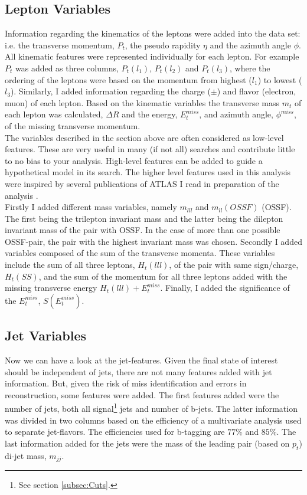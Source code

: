 \subsection{Lepton Variables}\label{subsec:LepSel}
Information regarding the kinematics of the leptons were added into the data set: i.e. the transverse momentum, $P_t$, the pseudo 
rapidity $\eta$ and the azimuth angle $\phi$. All kinematic features were represented individually for each lepton. For example $P_t$
was added as three columns, $P_t(l_1)$, $P_t(l_2)$ and $P_t(l_3)$, where the ordering of the leptons were based on the momentum from highest ($l_1$) to lowest ($l_3$).
Similarly, I added information regarding the charge ($\pm$) and flavor (electron, muon) of each lepton. Based on the kinematic variables
the transverse mass $m_t$ of each lepton was calculated, $\Delta R$ and the energy, $E_t^{miss}$, and azimuth angle, $\phi^{miss}$,
of the missing transverse momentum.
\\
The variables described in the section above are often considered as low-level features. These are very useful in many (if not all)
searches and contribute little to no bias to your analysis. High-level features can be added to guide a hypothetical model 
in its search. The higher level features used in this analysis were inspired by several publications of \ac{ATLAS} I read in 
preparation of the analysis \cite{franchini_search_2019, atlas_search_2021}. 
\\
Firstly I added different mass variables, namely $m_{lll}$ and $m_{ll}(OSSF)$ (\ac{OSSF}). The first being the trilepton invariant mass 
and the latter being the dilepton invariant mass of the pair with \ac{OSSF}. In the case of more than one possible \ac{OSSF}-pair,
the pair with the highest invariant mass was chosen. Secondly I added variables composed of the sum of the transverse momenta.
These variables include the sum of all three leptons, $H_t(lll)$, of the pair with same sign/charge, $H_t(SS)$, and the sum of the momentum
for all three leptons added with the missing transverse energy $H_t(lll) + E_t^{miss}$. Finally, I added the significance of the
$E_t^{miss}$, $S(E_t^{miss})$.
\subsection{Jet Variables}\label{subsec:JetSel}
Now we can have a look at the jet-features. Given the final state of interest should be independent of jets, there are not many
features added with jet information. But, given the risk of miss identification and errors in reconstruction, some features were 
added. The first features added were the number of jets, both all signal\footnote{See section \ref{subsec:Cuts}.} jets and number of b-jets.
The latter information was divided in two columns based on the efficiency of a multivariate analysis used to separate jet-flavors.
The efficiencies used for b-tagging are $77\%$ and $85\%$. The last information added for the jets were the mass of the leading pair 
(based on $p_t$) di-jet mass, $m_{jj}$.
